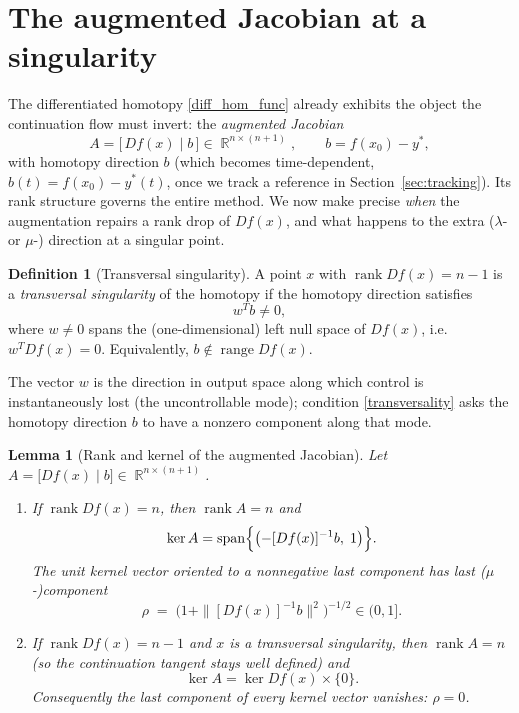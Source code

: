 \documentclass[11pt,american]{article}
\DeclareMathOperator{\R}{\mathbb{R}}
\DeclareMathOperator{\rank}{\operatorname{rank}}
\DeclareMathOperator{\range}{range}
\DeclareMathOperator{\spanop}{span}
\newtheorem{lemma}{Lemma}
\theoremstyle{definition}
\newtheorem{definition}{Definition}
\theoremstyle{plain}
\theoremstyle{remark}
\begin{document}
\section{The augmented Jacobian at a singularity}\label{sec:augmented}

The differentiated homotopy \eqref{diff_hom_func} already exhibits the object the continuation flow must invert: the \emph{augmented Jacobian}
\begin{equation}\label{eq:augmented}
A = \bigl[\, D f(x) \;\big|\; b \,\bigr] \in \R^{n\times(n+1)}, \qquad b = f(x_0) - y^*,
\end{equation}
with homotopy direction $b$ (which becomes time-dependent, $b(t) = f(x_0) - y^*(t)$, once we track a reference in Section~\ref{sec:tracking}). Its rank structure governs the entire method. We now make precise \emph{when} the augmentation repairs a rank drop of $Df(x)$, and what happens to the extra ($\lambda$- or $\mu$-) direction at a singular point.

\begin{definition}[Transversal singularity]\label{def:transversal}
A point $x$ with $\rank D f(x) = n-1$ is a \emph{transversal singularity} of the homotopy if the homotopy direction satisfies
\begin{equation}\label{transversality}
w^T b \ne 0,
\end{equation}
where $w \ne 0$ spans the (one-dimensional) left null space of $D f(x)$, i.e. $w^T D f(x) = 0$. Equivalently, $b \notin \range D f(x)$.
\end{definition}

The vector $w$ is the direction in output space along which control is instantaneously lost (the uncontrollable mode); condition \eqref{transversality} asks the homotopy direction $b$ to have a nonzero component along that mode.

\begin{lemma}[Rank and kernel of the augmented Jacobian]\label{lem:kernel}
Let $A = \bigl[ D f(x) \; \big| \; b \bigr] \in \R^{n\times(n+1)}$.
\begin{enumerate}
\item[(a)] If $\rank D f(x) = n$, then $\rank A = n$ and
\[
\ker A = \spanop\Bigl\{ \bigl( -[Df(x)]^{-1} b, \; 1 \bigr) \Bigr\}.
\]
The unit kernel vector oriented to a nonnegative last component has last ($\mu$-)component
\[
\rho \;=\; \bigl( 1 + \| [Df(x)]^{-1} b \|^2 \bigr)^{-1/2} \in (0,1].
\]
\item[(b)] If $\rank D f(x) = n-1$ and $x$ is a transversal singularity, then $\rank A = n$ (so the continuation tangent stays well defined) and
\[
\ker A = \ker D f(x) \times \{0\}.
\]
Consequently the last component of every kernel vector vanishes: $\rho = 0$.
\end{enumerate}
\end{lemma}
\end{document}

